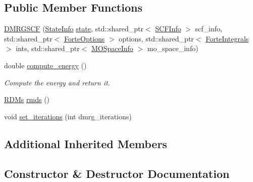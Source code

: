\subsection*{Public Member Functions}
\begin{DoxyCompactItemize}
\item 
\mbox{\hyperlink{classforte_1_1_d_m_r_g_s_c_f_a0f235613ad5aa55bea3fa6573dfb26f7}{D\+M\+R\+G\+S\+CF}} (\mbox{\hyperlink{classforte_1_1_state_info}{State\+Info}} \mbox{\hyperlink{classforte_1_1_active_space_method_a609f005cc7d3a1bc03ae517002eb19dc}{state}}, std\+::shared\+\_\+ptr$<$ \mbox{\hyperlink{classforte_1_1_s_c_f_info}{S\+C\+F\+Info}} $>$ scf\+\_\+info, std\+::shared\+\_\+ptr$<$ \mbox{\hyperlink{classforte_1_1_forte_options}{Forte\+Options}} $>$ options, std\+::shared\+\_\+ptr$<$ \mbox{\hyperlink{classforte_1_1_forte_integrals}{Forte\+Integrals}} $>$ ints, std\+::shared\+\_\+ptr$<$ \mbox{\hyperlink{classforte_1_1_m_o_space_info}{M\+O\+Space\+Info}} $>$ mo\+\_\+space\+\_\+info)
\item 
double \mbox{\hyperlink{classforte_1_1_d_m_r_g_s_c_f_a19128db2df6992b295bd00d85c43309d}{compute\+\_\+energy}} ()
\begin{DoxyCompactList}\small\item\em Compute the energy and return it. \end{DoxyCompactList}\item 
\mbox{\hyperlink{classforte_1_1_r_d_ms}{R\+D\+Ms}} \mbox{\hyperlink{classforte_1_1_d_m_r_g_s_c_f_a70de6c01bece616cd3ae66d337bc9b2f}{rmds}} ()
\item 
void \mbox{\hyperlink{classforte_1_1_d_m_r_g_s_c_f_ad4ba1745cefafba8b6d417ce4dbd9489}{set\+\_\+iterations}} (int dmrg\+\_\+iterations)
\end{DoxyCompactItemize}
\subsection*{Additional Inherited Members}


\subsection{Constructor \& Destructor Documentation}
\mbox{\label{classforte_1_1_d_m_r_g_s_c_f_a0f235613ad5aa55bea3fa6573dfb26f7}} 
